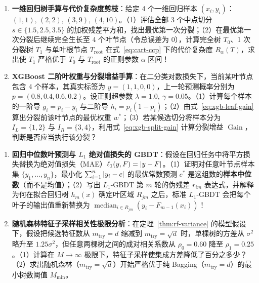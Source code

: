 \begin{enumerate}[label=\textbf{5.\arabic*}, resume]
  \item \textbf{一维回归树手算与代价复杂度剪枝}：给定 4 个一维回归样本 $(x_i, y_i)$：$(1, 1),\, (2, 2),\, (3, 9),\, (4, 10)$。（1）评估全部 3 个中点切分 $s \in \{1.5, 2.5, 3.5\}$ 的加权残差平方和，找出最优第一次分裂；（2）在最优第一次分裂后继续完全生长至 4 个叶节点（令总误差为 $0$），计算完全树 $T_0$、1 次分裂树 $T_1$ 与单叶根节点 $T_{\text{root}}$ 在式~\eqref{eq:cart-ccp} 下的代价复杂度 $R_\alpha(T)$，求出使 $T_1$ 严格优于 $T_0$ 与 $T_{\text{root}}$ 的正则参数 $\alpha$ 区间！

  \item \textbf{XGBoost 二阶叶权重与分裂增益手算}：在二分类对数损失下，当前某叶节点包含 4 个样本，其真实标签为 $y = (1, 1, 0, 0)$，上一轮预测概率分别为 $p = (0.8, 0.4, 0.6, 0.2)$。设正则超参数 $\lambda = 1.0,\ \gamma = 0.05$。（1）计算每个样本的一阶导 $g_i = p_i - y_i$ 与二阶导 $h_i = p_i(1 - p_i)$；（2）由式~\eqref{eq:xgb-leaf-gain} 算出分裂前该叶节点的最优权重 $w^*$；（3）若某候选切分将样本分为 $I_L = \{1, 2\}$ 与 $I_R = \{3, 4\}$，利用式~\eqref{eq:xgb-split-gain} 计算分裂增益 $\operatorname{Gain}$，判断是否应当执行该分裂？
\end{enumerate}


\begin{enumerate}[label=\textbf{5.\arabic*}, resume]
  \item \textbf{回归中位数叶预测与 $L_1$ 绝对值损失的 GBDT}：假设在回归任务中将平方损失替换为绝对值损失（MAE）$\ell_1(y, F) = \left|y - F\right|$。（1）证明对任意叶节点样本集 $\{y_1, \dots, y_n\}$，最小化 $\sum_{i=1}^n \left|y_i - c\right|$ 的最优常数预测 $c^*$ 是这组数的\textbf{样本中位数}（而不是均值）；（2）写出 $L_1$-GBDT 第 $m$ 轮的伪残差 $r_{im}$ 表达式，并解释为何在拟合回归树 $h_m(x)$ 确定叶区域 $R_{jm}$ 之后，标准 $L_1$-GBDT 会把每个叶子的输出值重新替换为 $\operatorname{median}_{i \in R_{jm}}(y_i - F_{m-1}(x_i))$！

  \item \textbf{随机森林特征子采样相关性极限分析}：在定理~\ref{thm:rf-variance} 的模型假设下，假设把候选特征数从 $m_{\text{try}} = d$ 缩减到 $m_{\text{try}} = \sqrt{d}$ 时，单棵树的方差从 $\sigma^2$ 略升至 $1.25\sigma^2$，但任意两棵树之间的成对相关系数从 $\rho_0 = 0.60$ 降至 $\rho_1 = 0.25$。（1）计算在 $M \to \infty$ 极限下，特征子采样使集成方差降低了百分之多少？（2）求出随机森林（$m_{\text{try}}=\sqrt{d}$）开始严格优于纯 Bagging（$m_{\text{try}}=d$）的最小树数阈值 $M_{\min}$。
\end{enumerate}

